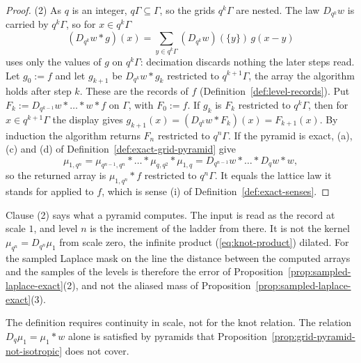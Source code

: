 \begin{proof}
(2) As $q$ is an integer, $q\Gamma \subseteq \Gamma$, so the grids $q^k\Gamma$ are nested. The law
$D_{q^k}w$ is carried by $q^k\Gamma$, so for $x \in q^k\Gamma$
\[
(D_{q^k}w * g)(x) = \sum_{y \in q^k\Gamma}(D_{q^k}w)(\{y\})\,g(x - y)
\]
uses only the values of $g$ on $q^k\Gamma$: decimation discards nothing the later steps read. Let
$g_0 := f$ and let $g_{k+1}$ be $D_{q^k}w * g_k$ restricted to $q^{k+1}\Gamma$, the array the
algorithm holds after step $k$. These are the records of $f$ (Definition~\ref{def:level-records}). Put $F_k := D_{q^{k-1}}w * \dots * w * f$ on $\Gamma$, with
$F_0 := f$. If $g_k$ is $F_k$ restricted to $q^k\Gamma$, then for $x \in q^{k+1}\Gamma$ the display
gives $g_{k+1}(x) = (D_{q^k}w * F_k)(x) = F_{k+1}(x)$. By induction the algorithm returns $F_n$
restricted to $q^n\Gamma$. If the pyramid is exact, (a), (c) and (d) of
Definition~\ref{def:exact-grid-pyramid} give
\[
\mu_{1,q^n} = \mu_{q^{n-1},q^n} * \dots * \mu_{q,q^2} * \mu_{1,q} = D_{q^{n-1}}w * \dots * D_qw * w,
\]
so the returned array is $\mu_{1,q^n} * f$ restricted to $q^n\Gamma$. It equals the lattice law it
stands for applied to $f$, which is sense (i) of Definition~\ref{def:exact-senses}.
\end{proof}

Clause (2) says what a pyramid computes. The input is read as the record at scale $1$, and level
$n$ is the increment of the ladder from there. It is not the kernel $\mu_{q^n} = D_{q^n}\mu_1$ from
scale zero, the infinite product (\ref{eq:knot-product}) dilated. For the sampled Laplace mask on
the line the distance between the computed arrays and the samples of the \Matern{} levels is
therefore the error of Proposition~\ref{prop:sampled-laplace-exact}(2), and not the aliased mass of
Proposition~\ref{prop:sampled-laplace-exact}(3).

The definition requires continuity in scale, not for the knot relation. The relation
$D_q\mu_1 = \mu_1 * w$ alone is satisfied by pyramids that
Proposition~\ref{prop:grid-pyramid-not-isotropic} does not cover.

